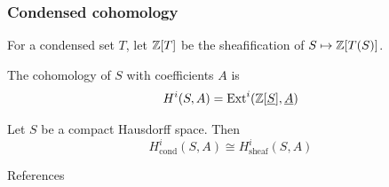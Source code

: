 \documentclass{beamer}
\begin{document}
\begin{frame}
    \frametitle{Condensed cohomology}

    For a condensed set $T$, let $\mathbb{Z}[T]$ be the sheafification
    of $S \mapsto \mathbb{Z}[T(S)]$.
    \begin{definition}
        The cohomology of $S$ with coefficients $A$ is
        \begin{equation*}
            H^i (S, A) = \operatorname{Ext}^i(\mathbb{Z}[\underline{S}], \underline{A})
        \end{equation*}
    \end{definition}

    \pause
    \begin{theorem}
        Let $S$ be a compact Hausdorff space. Then
        \begin{equation*}
            H^i_{\text{cond}}(S, A) \cong H^i_{\text{sheaf}}(S, A)
        \end{equation*}
    \end{theorem}

\end{frame}


\begin{frame}{References}
    \nocite{Sch2019LecturesCM}
    \nocite{Apa2021condensed}
    \nocite{stacks-project}
    \nocite{Sch2020MasterClass}
    
\end{frame}
\end{document}
